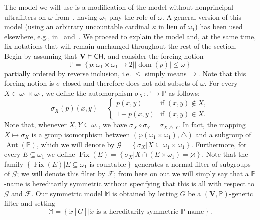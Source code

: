 \documentclass[10pt]{amsart}
\DeclareMathOperator{\dom}{dom}
\DeclareMathOperator{\fix}{Fix}
\DeclareMathOperator{\aut}{Aut}
\newcommand{\ch}{\mathnormal{\mathsf{CH}}}
\theoremstyle{definition}
\theoremstyle{remark}
\begin{document}
The model we will use is a modification of the model without nonprincipal ultrafilters on $\omega$ from~\cite[pp. 391--392]{halbeisen}, having $\omega_1$ play the role of $\omega$. A general version of this model (using an arbitrary uncountable cardinal $\kappa$ in lieu of $\omega_1$) has been used elsewhere, e.g., in~ \cite[Thm. 3.1]{modelspectraofuniformity} and~\cite[pp. 12ss.]{usuba2024notelosstheorem}. We proceed to explain the model and, at the same time, fix notations that will remain unchanged throughout the rest of the section. Begin by assuming that $\mathbf{V}\vDash\ch$, and consider the forcing notion
\begin{equation*}
    \mathbb{P}=\left\{p;\omega_1 \times \omega_1\longrightarrow 2\big||\dom(p)|\leq \omega\right\}
\end{equation*}
partially ordered by reverse inclusion, i.e. $\leq$ simply means $\supseteq$. Note that this forcing notion is $\sigma$-closed and therefore does not add subsets of $\omega$. For every $X \subset \omega_1 \times \omega_1$, we define the automorphism $\sigma_X:\mathbb{P}\longrightarrow\mathbb P$ as follows:
\begin{equation*}
    \sigma_X(p)(x, y) =
                \begin{cases}
                    p(x, y) & \text{if } (x, y) \notin X, \\
                    1 - p(x, y) & \text{if } (x, y) \in X.
                \end{cases}
\end{equation*}
Note that, whenever $X,Y\subseteq\omega_1$, we have $\sigma_X \circ \sigma_Y = \sigma_{X \bigtriangleup Y}$. In fact, the mapping $X\longmapsto\sigma_X$ is a group isomorphism between $(\wp(\omega_1\times\omega_1),\bigtriangleup)$ and a subgroup of $\aut(\mathbb P)$, which we will denote by $\mathcal{G}=\left\{\sigma_X\big|X\subseteq \omega_1\times \omega_1\right\}$. Furthermore, for every $E\subseteq \omega_1$ we define $\fix(E)=\left\{\sigma_X\big|X\cap (E\times \omega_1)=\varnothing\right\}$. Note that the family $\left\{\fix(E)\big|E\subseteq \omega_1 \text{ is countable}\right\}$ generates a normal filter of subgroups of $\mathcal G$; we will denote this filter by $\mathscr F$; from here on out we will simply say that a $\mathbb P$-name is hereditarily symmetric without specifying that this is all with respect to $\mathcal G$ and $\mathscr F$. Our symmetric model $\mathbb M$ is obtained by letting $G$ be a $(\mathbf{V},\mathbb P)$-generic filter and setting
\begin{equation*}
    \mathbb M=\left\{\mathring{x}[G]\big|\mathring{x}\text{ is a hereditarily symmetric }\mathbb P\text{-name}\right\}.
\end{equation*}
\end{document}
